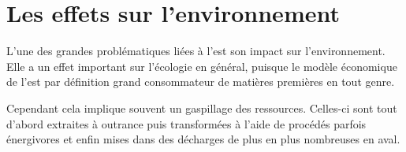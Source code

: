 \section{Les effets sur l’environnement }

\smallbreak L'une des grandes problématiques liées à l'\op est son impact sur l'environnement. Elle a un effet important sur l'écologie en général, puisque le modèle économique de l'\op est par définition grand consommateur de matières premières en tout genre. 

Cependant cela implique souvent un gaspillage des ressources. Celles-ci sont tout d'abord extraites à outrance puis transformées à l'aide de procédés parfois énergivores et enfin mises dans des décharges de plus en plus nombreuses en aval. 
